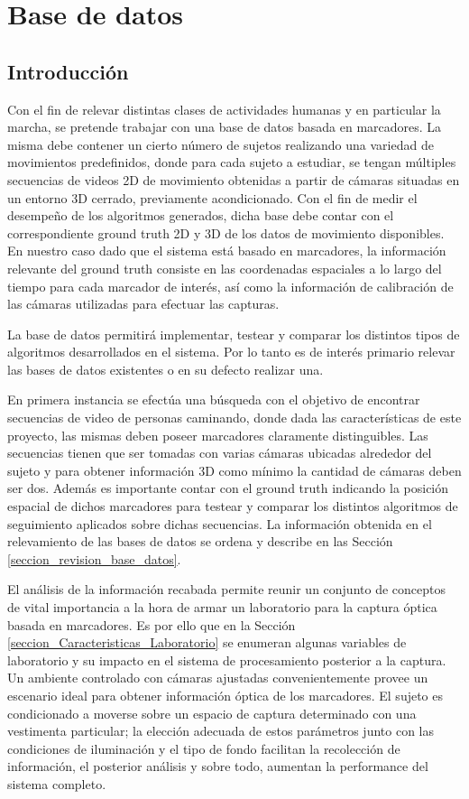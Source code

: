 \chapter{Base de datos} \label{section_base_de_datos}


\section{Introducción} 
Con el fin de relevar distintas clases de actividades humanas y en particular la marcha, se pretende trabajar con una base de datos basada en marcadores. La misma debe contener un cierto número de sujetos realizando una variedad de movimientos predefinidos, donde para cada sujeto a estudiar, se tengan múltiples secuencias de videos 2D de movimiento obtenidas a partir de cámaras situadas en un entorno 3D cerrado, previamente acondicionado. Con el fin de medir el desempeño de los algoritmos generados, dicha base debe contar con el correspondiente ground truth 2D y 3D de los datos de movimiento disponibles. En nuestro caso dado que el  sistema está basado en marcadores, la información relevante del ground truth consiste en las coordenadas espaciales a lo largo del tiempo para cada marcador de interés, así como la información de calibración de las cámaras utilizadas para efectuar las capturas.


La base de datos permitirá implementar, testear y comparar los distintos tipos de algoritmos desarrollados en el sistema. Por lo tanto es de interés primario relevar las bases de datos existentes o en su defecto realizar una.


En primera instancia se efectúa una búsqueda con el objetivo de encontrar secuencias de video de personas caminando, donde dada las características de este proyecto, las mismas deben poseer marcadores claramente distinguibles. Las secuencias tienen que ser tomadas con varias cámaras ubicadas alrededor del sujeto y para obtener información 3D como mínimo la cantidad de cámaras deben ser dos. Además es importante contar con el ground truth indicando la posición espacial de dichos marcadores para testear y comparar los distintos algoritmos de seguimiento aplicados sobre dichas secuencias. La información obtenida en el relevamiento de las bases de datos se ordena y describe en las Sección \ref{seccion_revision_base_datos}.


El análisis de la información recabada permite reunir un conjunto de conceptos de vital importancia a la hora de armar un laboratorio para la captura óptica basada en marcadores. Es por ello que en la Sección \ref{seccion_Caracteristicas_Laboratorio} se enumeran algunas variables de laboratorio y su impacto en el sistema de procesamiento posterior a la captura. Un ambiente controlado con cámaras ajustadas convenientemente provee un escenario ideal para obtener información óptica de los marcadores. El sujeto es condicionado a moverse sobre un espacio de captura determinado con una vestimenta particular; la elección adecuada de estos parámetros junto con las condiciones de iluminación y el tipo de fondo facilitan la recolección de información, el posterior análisis y sobre todo, aumentan la performance del sistema completo.




